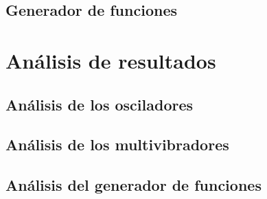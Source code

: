 \documentclass{article}
\begin{document}
\subsection{Generador de funciones}
\label{sec:resultados-generador-funciones}

\FloatBarrier

\section{Análisis de resultados}
\subsection{Análisis de los  osciladores}

\FloatBarrier
\subsection{Análisis de los multivibradores}

\FloatBarrier
\subsection{Análisis del generador de funciones}


\FloatBarrier


\FloatBarrier

\printbibliography[heading=bibintoc, title={Bibliografía}]
\end{document}
